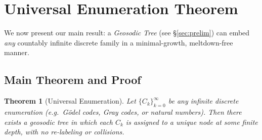 \documentclass[acmsmall]{acmart}
\newtheorem{theorem}{Theorem}
\theoremstyle{definition}
\theoremstyle{remark}
\begin{document}
      \section{Universal Enumeration Theorem}
\label{sec:enumeration}

We now present our main result: a \emph{Geosodic Tree} (see \S\ref{sec:prelim})
can embed \emph{any} countably infinite discrete family in a minimal-growth, meltdown-free manner.

\subsection{Main Theorem and Proof}

\begin{theorem}[Universal Enumeration]
\label{thm:univenum}
Let $\{C_k\}_{k=0}^\infty$ be any infinite discrete enumeration (e.g.\ G\"odel codes, Gray codes, 
or natural numbers). Then there exists a geosodic tree in which each $C_k$ is assigned to a unique node 
at some finite depth, with no re-labeling or collisions.
\end{theorem}
\end{document}
